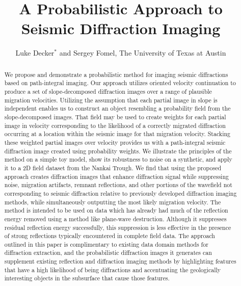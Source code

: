 

\title{A Probabilistic Approach to Seismic Diffraction Imaging}
\author{Luke Decker$^*$ and Sergey Fomel, The University of Texas at Austin}
\address{
Oden Institute for Computational Engineering and Sciences \\
The University of Texas at Austin \\
201 E 24th St, \\
Austin, TX 78712 \\
decker.luke@utexas.edu
}


\maketitle
\begin{abstract}

We propose and demonstrate a probabilistic method for imaging seismic diffractions based on path-integral imaging.  Our approach utilizes oriented velocity continuation to produce a set of slope-decomposed diffraction images over a range of plausible migration velocities.  Utilizing the assumption that each partial image in slope is independent enables us to construct an object resembling a probability field from the  slope-decomposed images. That field may be used to create weights for each partial image in velocity corresponding to the likelihood of a correctly migrated diffraction occurring at a location within the seismic image for that migration velocity.  Stacking these weighted partial images over velocity provides us with a path-integral seismic diffraction image created using probability weights.  We illustrate the principles of the method on a simple toy model, show its robustness to noise on a synthetic,  and apply it to a 2D field dataset from the Nankai Trough. 
We find that using the proposed approach creates diffraction images that  enhance diffraction signal while suppressing noise, migration artifacts, remnant reflections, and other portions of the wavefield not corresponding to seismic diffraction relative to previously developed diffraction imaging methods, while simultaneously outputting the most likely migration velocity. The method is intended to be used on data which has already had much of the reflection energy removed using a method like plane-wave destruction.  Although it suppresses residual reflection energy successfully, this suppression is less effective in the presence of strong reflections typically encountered in complete field data. The approach outlined in this paper is complimentary to existing data domain methods for diffraction extraction, and the probabilistic diffraction images it generates can supplement existing reflection and diffraction imaging methods by highlighting features that have a high likelihood of being diffractions and accentuating the geologically interesting objects in the subsurface that cause those features. 

\end{abstract}

